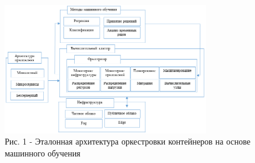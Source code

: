 \begin{figure}[H]
	\centering
	\includegraphics[width=0.8\textwidth]{assets/1000}
	\caption*{Рис. 1 - Эталонная архитектура оркестровки контейнеров на основе машинного обучения}
\end{figure}

